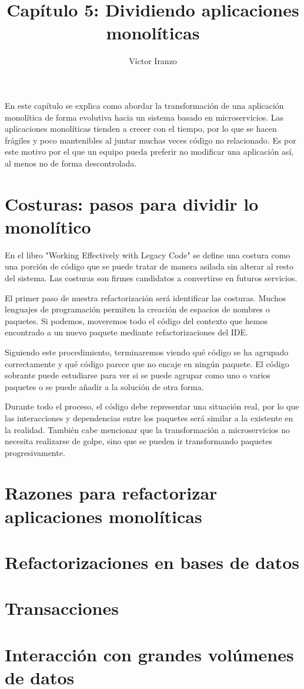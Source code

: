 \documentclass[11pt,a4paper]{article}
\author{Víctor Iranzo}
\title{Capítulo 5: Dividiendo aplicaciones monolíticas}
\begin{document}
\maketitle

En este capítulo se explica como abordar la transformación de una aplicación monolítica de forma evolutiva hacia un sistema basado en microservicios. Las aplicaciones monolíticas tienden a crecer con el tiempo, por lo que se hacen frágiles y poco mantenibles al juntar muchas veces código no relacionado. Es por este motivo por el que un equipo pueda preferir no modificar una aplicación así, al menos no de forma descontrolada.

\part{Costuras: pasos para dividir lo monolítico}

En el libro "Working Effectively with Legacy Code" se define una costura como una porción de código que se puede tratar de manera asilada sin alterar al resto del sistema. Las costuras son firmes candidatos a convertirse en futuros servicios.

El primer paso de nuestra refactorización será identificar las costuras. Muchos lenguajes de programación permiten la creación de espacios de nombres o paquetes. Si podemos, moveremos todo el código del contexto que hemos encontrado a un nuevo paquete mediante refactorizaciones del IDE. 

Siguiendo este procedimiento, terminaremos viendo qué código se ha agrupado correctamente y qué código parece que no encaje en ningún paquete. El código sobrante puede estudiarse para ver si se puede agrupar como uno o varios paquetes o se puede añadir a la solución de otra forma. 

Durante todo el proceso, el código debe representar una situación real, por lo que las interacciones y dependencias entre los paquetes será similar a la existente en la realidad. También cabe mencionar que la transformación a microservicios no necesita realizarse de golpe, sino que se pueden ir transformando paquetes progresivamente.

\part{Razones para refactorizar aplicaciones monolíticas}

\part{Refactorizaciones en bases de datos}

\part{Transacciones}

\part{Interacción con grandes volúmenes de datos}
\end{document}
